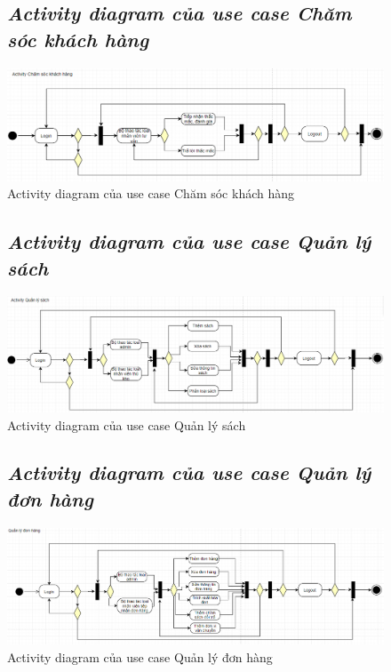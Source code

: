 \documentclass{report}
\begin{document}
\begin{figure}[htp]
    \subsection{\textit{Activity diagram của use case Chăm sóc khách hàng}}
    \centering
    \includegraphics[scale = 0.55]{image/activity_cskh.PNG}
    \caption{Activity diagram của use case Chăm sóc khách hàng}
\end{figure}

\begin{figure}[htp]
    \subsection{\textit{Activity diagram của use case Quản lý sách}}
    \centering
    \includegraphics[scale = 0.5]{image/activity_qls.PNG}
    \caption{Activity diagram của use case Quản lý sách}
\end{figure}

\begin{figure}[htp]
    \subsection{\textit{Activity diagram của use case Quản lý đơn hàng}}
    \centering
    \includegraphics[scale = 0.5]{image/activity_qldh.PNG}
    \caption{Activity diagram của use case Quản lý đơn hàng}
\end{figure}
\end{document}
